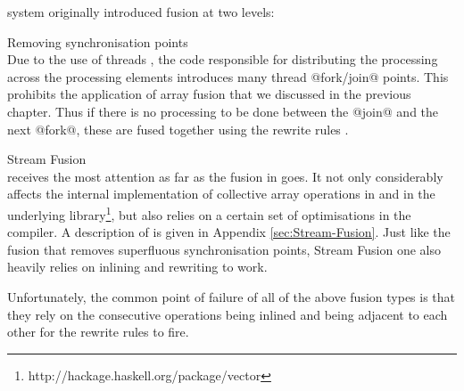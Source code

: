 \documentclass[preamble.tex]{subfiles}
\begin{document}
\DPH system originally introduced fusion at two levels:
\begin{description}
\label{list:DPH-fusion-levels}
\item Removing synchronisation points \hfill \\

Due to the use of \Haskell threads \cite{Jones08atutorial}, the code responsible for distributing the processing across the processing elements\ipe{} introduces many thread @fork/join@ points. This prohibits the application of array fusion that we discussed in the previous chapter. Thus if there is no processing to be done between the @join@ and the next @fork@, these are fused together using the rewrite rules\irwrules{} \cite{PTH01}.

\item Stream Fusion \hfill \\

\istreamfusion{} receives the most attention as far as the fusion in \DPH goes. It not only considerably affects the internal implementation of collective array operations in \DPH and in the underlying  library\footnote{http://hackage.haskell.org/package/vector}, but also relies on a certain set of optimisations in the compiler. A description of  is given in Appendix \ref{sec:Stream-Fusion}. Just like the fusion that removes superfluous synchronisation points, Stream Fusion one also heavily relies on inlining and rewriting to work.
\end{description}

Unfortunately, the common point of failure of all of the above fusion types is that they rely on the consecutive operations being inlined and being adjacent to each other for the rewrite rules to fire.


\IfNotCompilingAll{}
\end{document}
